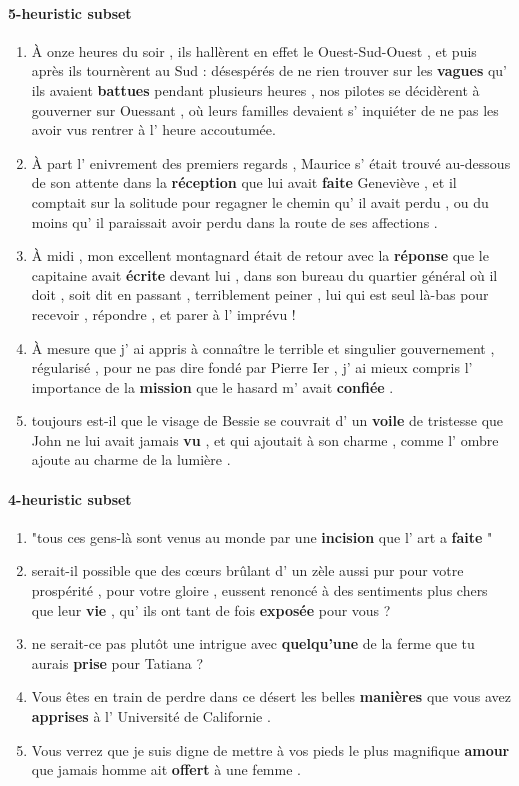 \paragraph{5-heuristic subset}
\begin{enumerate}[itemsep=0pt,label=\arabic*).]
    \item À onze heures du soir , ils hallèrent en effet le Ouest-Sud-Ouest , et puis après ils tournèrent au Sud : désespérés de ne rien trouver sur les \textbf{vagues} qu' ils avaient \textbf{battues} pendant plusieurs heures , nos pilotes se décidèrent à gouverner sur Ouessant , où leurs familles devaient s' inquiéter de ne pas les avoir vus rentrer à l' heure accoutumée.
    \item À part l' enivrement des premiers regards , Maurice s' était trouvé au-dessous de son attente dans la \textbf{réception} que lui avait \textbf{faite} Geneviève , et il comptait sur la solitude pour regagner le chemin qu' il avait perdu , ou du moins qu' il paraissait avoir perdu dans la route de ses affections .
    \item À midi , mon excellent montagnard était de retour avec la \textbf{réponse} que le capitaine avait \textbf{écrite} devant lui , dans son bureau du quartier général où il doit , soit dit en passant , terriblement peiner , lui qui est seul là-bas pour recevoir , répondre , et parer à l' imprévu !
    \item À mesure que j' ai appris à connaître le terrible et singulier gouvernement , régularisé , pour ne pas dire fondé par Pierre Ier , j' ai mieux compris l' importance de la \textbf{mission} que le hasard m' avait \textbf{confiée} .
    \item toujours est-il que le visage de Bessie se couvrait d' un \textbf{voile} de tristesse que John ne lui avait jamais \textbf{vu} , et qui ajoutait à son charme , comme l' ombre ajoute au charme de la lumière .
\end{enumerate}

\paragraph{4-heuristic subset}
\begin{enumerate}[itemsep=0pt,label=\arabic*).]
    \item "tous ces gens-là sont venus au monde par une \textbf{incision} que l' art a \textbf{faite} "
    \item serait-il possible que des cœurs brûlant d' un zèle aussi pur pour votre prospérité , pour votre gloire , eussent renoncé à des sentiments plus chers que leur \textbf{vie} , qu' ils ont tant de fois \textbf{exposée} pour vous ?
    \item ne serait-ce pas plutôt une intrigue avec \textbf{quelqu'une} de la ferme que tu aurais \textbf{prise} pour Tatiana ?
    \item Vous êtes en train de perdre dans ce désert les belles \textbf{manières} que vous avez \textbf{apprises} à l' Université de Californie .
    \item Vous verrez que je suis digne de mettre à vos pieds le plus magnifique \textbf{amour} que jamais homme ait \textbf{offert} à une femme .
\end{enumerate}

